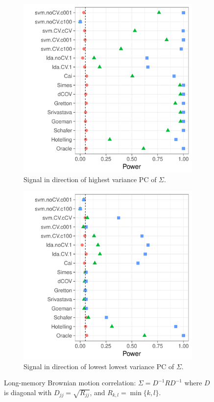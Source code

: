 \documentclass[]{bio}
\begin{document}
\begin{figure}[h]
	\centering
	\begin{subfigure}[t]{.45\columnwidth}
		\centering
		\includegraphics[width=1\columnwidth]{"art/file22"}
		\caption{Signal in direction of highest variance PC of $\Sigma$.} 
		\label{fig:dependence_21}
	\end{subfigure}
	\begin{subfigure}[t]{.45\columnwidth}
		\centering
		\includegraphics[width=1\columnwidth]{"art/file23"}
		\caption{Signal in direction of lowest lowest variance PC of $\Sigma$.} 
		\label{fig:dependence_22}
	\end{subfigure}
	\caption{Long-memory Brownian motion correlation: $\Sigma=D^{-1} R D^{-1}$ where $D$ is diagonal with $D_{jj}=\sqrt{R_{jj}}$, and $R_{k,l}=\min\{k,l\}$.}	
	\label{fig:dependence_2}
\end{figure}
\end{document}
